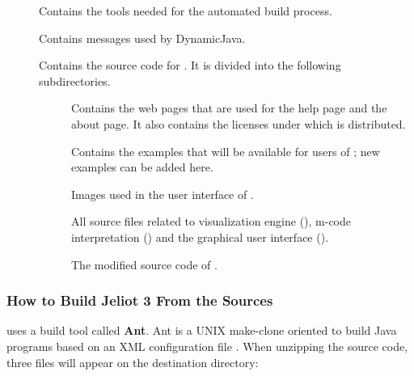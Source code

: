 \begin{description}

	\item[] Contains the tools needed for the automated build process.

	\item[] Contains messages used by DynamicJava.

	\item[] Contains the source code for \jel{}. It is divided into the following subdirectories.

	\begin{description}
	
		\item[] Contains the web pages that are used for the help page and the about page. It also contains the licenses under which \jel{} is distributed.
	
		\item[] Contains the examples that will be available for users of \jel{}; new examples can be added here.
	
		\item[] Images used in the user interface of \jel{}.
	
		\item[] All source files related to \jel{} visualization engine (), m-code interpretation () and the graphical user interface ().

		\item[] The modified source code of \djava{}.
	
	\end{description}
	
\end{description}

\subsubsection{How to Build Jeliot 3 From the Sources}

\jel{} uses a build tool called {\bf Ant}. Ant is a UNIX make-clone oriented to build Java programs based on an XML configuration file \citep{Ant}. When unzipping the source code, three files will appear on the destination directory:

